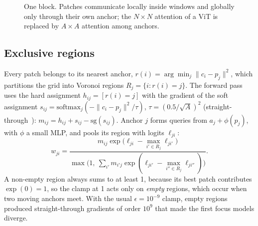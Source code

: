 \documentclass[10pt]{article}
\begin{document}
\begin{figure}[t]
\centering
{}
\caption{One block. Patches communicate locally inside windows and globally only through their
own anchor; the $N\times N$ attention of a ViT is replaced by $A\times A$ attention among anchors.}
\label{fig:block}
\end{figure}

\subsection{Exclusive regions}

Every patch belongs to its nearest anchor, $r(i)=\arg\min_j\|c_i-p_j\|^2$, which partitions the
grid into Voronoi regions $R_j=\{i: r(i)=j\}$. The forward pass uses the hard assignment
$h_{ij}=[r(i)=j]$ with the gradient of the soft assignment
$s_{ij}=\mathrm{softmax}_j(-\|c_i-p_j\|^2/\tau)$, $\tau=(0.5/\sqrt{A})^2$
(straight-through~\citep{bengio2013straight}): $m_{ij}=h_{ij}+s_{ij}-\mathrm{sg}(s_{ij})$.
Anchor $j$ forms queries from $a_j+\phi(p_j)$, with $\phi$ a small MLP, and pools its region with
logits $\ell_{ji}$:
\begin{equation}
w_{ji}=\frac{m_{ij}\exp\!\big(\ell_{ji}-\max_{i'\in R_j}\ell_{ji'}\big)}
{\max\!\big(1,\ \sum_{i'} m_{i'j}\exp(\ell_{ji'}-\max_{i''\in R_j}\ell_{ji''})\big)} .
\label{eq:pool}
\end{equation}
A non-empty region always sums to at least 1, because its best patch contributes $\exp(0)=1$, so
the clamp at 1 acts only on \emph{empty} regions, which occur when two moving anchors meet. With
the usual $\epsilon=10^{-9}$ clamp, empty regions produced straight-through gradients of order
$10^{9}$ that made the first focus models diverge.
\end{document}
